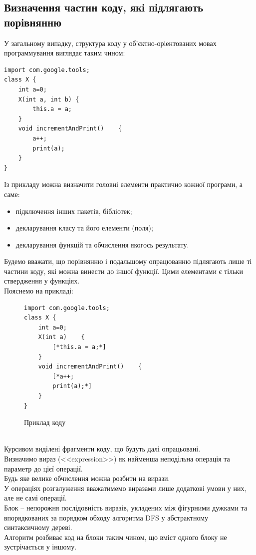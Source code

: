 \documentclass[a4paper, 14pt]{article}
\begin{document}
\subsection{Визначення частин коду, які підлягають порівнянню}
У загальному випадку, структура коду у об'єктно-оріентованих мовах программування виглядає таким чином: \\
\begin{lstlisting}[frame=none, xleftmargin=.3\textwidth]
import com.google.tools;
class X {
	int a=0;
	X(int a, int b)	{
		this.a = a;
	}
	void incrementAndPrint()	{
		a++;
		print(a);
	}
}
\end{lstlisting}
Із прикладу можна визначити головні елементи практично кожної програми, а саме:
\begin{itemize}
\item підключення інших пакетів, бібліотек;
\item декларування класу та його елементи (поля);
\item декларування функцій та обчислення якогось результату.
\end{itemize}
Будемо вважати, що порівнянню і подальшому опрацюванню підлягають лише ті частини коду, які можна винести до іншої функції.
Цими елементами є тільки ствердження у функціях.\\
Пояснемо на прикладі: \\
\begin{figure}[h!]
\begin{lstlisting}[frame=none, xleftmargin=.3\textwidth]
import com.google.tools;
class X {
	int a=0;
	X(int a)	{
		[*this.a = a;*]
	}
	void incrementAndPrint()	{
		[*a++;
		print(a);*]
	}
}
\end{lstlisting}
\caption*{Приклад коду}
\end{figure} \\
Курсивом виділені фрагменти коду, що будуть далі опрацьовані. \\
Визначимо вираз (<<expression>>) як найменша неподільна операція та параметр до цієї операції. \\ Будь яке велике обчислення можна розбити на вирази. \\
У операціях розгалуження вважатимемо виразами лише додаткові умови у них, але не самі операції. \\
Блок -- непорожня послідовність виразів, укладених між фігурними дужками та впорядкованих за порядком обходу алгоритма DFS у абстрактному синтаксичному дереві. \\
Алгоритм розбиває код на блоки таким чином, що вміст одного блоку не зустрічається у іншому. \\
\end{document}
